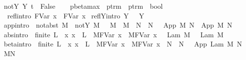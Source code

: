 \begin{isabellebody}
{\isacharbar}\ {\isachardoublequoteopen}not{\isacharunderscore}Y\ {\isacharparenleft}Y\ t{\isacharparenright}\ {\isacharequal}\ False{\isachardoublequoteclose}\isanewline
\isanewline
{}\isamarkupfalse%
\ \isanewline
\ \ pbeta{\isacharunderscore}max\ {\isacharcolon}{\isacharcolon}\ {\isachardoublequoteopen}ptrm\ {\isasymRightarrow}\ ptrm\ {\isasymRightarrow}\ bool{\isachardoublequoteclose}\ {\isacharparenleft}{\isachardoublequoteopen}{\isacharunderscore}\ {\isachargreater}{\isachargreater}{\isachargreater}\ {\isacharunderscore}{\isachardoublequoteclose}\ {\isacharbrackleft}{}{}{\isacharcomma}{}{}{\isacharbrackright}\ {}{}{\isacharparenright}\isanewline
{}\isanewline
\ \ refl{\isacharbrackleft}intro{\isacharbrackright}{\isacharcolon}\ {\isachardoublequoteopen}{\isacharparenleft}FVar\ x{\isacharparenright}\ {\isachargreater}{\isachargreater}{\isachargreater}\ {\isacharparenleft}FVar\ x{\isacharparenright}{\isachardoublequoteclose}\isanewline
{\isacharbar}\ reflY{\isacharbrackleft}intro{\isacharbrackright}{\isacharcolon}\ {\isachardoublequoteopen}Y\ {\isasymsigma}\ {\isachargreater}{\isachargreater}{\isachargreater}\ Y\ {\isasymsigma}{\isachardoublequoteclose}\isanewline
{\isacharbar}\ app{\isacharbrackleft}intro{\isacharbrackright}{\isacharcolon}\ {\isachardoublequoteopen}{\isasymlbrakk}\ not{\isacharunderscore}abst\ M\ {\isacharsemicolon}\ not{\isacharunderscore}Y\ M\ {\isacharsemicolon}\ \ M\ {\isachargreater}{\isachargreater}{\isachargreater}\ M{\isacharprime}\ {\isacharsemicolon}\ N\ {\isachargreater}{\isachargreater}{\isachargreater}\ N{\isacharprime}\ {\isasymrbrakk}\ {\isasymLongrightarrow}\ App\ M\ N\ {\isachargreater}{\isachargreater}{\isachargreater}\ App\ M{\isacharprime}\ N{\isacharprime}{\isachardoublequoteclose}\isanewline
{\isacharbar}\ abs{\isacharbrackleft}intro{\isacharbrackright}{\isacharcolon}\ {\isachardoublequoteopen}{\isasymlbrakk}\ finite\ L\ {\isacharsemicolon}\ {\isacharparenleft}{\isasymAnd}x{\isachardot}\ x\ {\isasymnotin}\ L\ {\isasymLongrightarrow}\ M{\isacharcircum}{\isacharparenleft}FVar\ x{\isacharparenright}\ {\isachargreater}{\isachargreater}{\isachargreater}\ M{\isacharprime}{\isacharcircum}{\isacharparenleft}FVar\ x{\isacharparenright}{\isacharparenright}\ {\isasymrbrakk}\ {\isasymLongrightarrow}\ Lam\ M\ {\isachargreater}{\isachargreater}{\isachargreater}\ \ Lam\ M{\isacharprime}{\isachardoublequoteclose}\isanewline
{\isacharbar}\ beta{\isacharbrackleft}intro{\isacharbrackright}{\isacharcolon}\ {\isachardoublequoteopen}{\isasymlbrakk}\ finite\ L\ {\isacharsemicolon}\ {\isacharparenleft}{\isasymAnd}x{\isachardot}\ x\ {\isasymnotin}\ L\ {\isasymLongrightarrow}\ M{\isacharcircum}{\isacharparenleft}FVar\ x{\isacharparenright}\ {\isachargreater}{\isachargreater}{\isachargreater}\ M{\isacharprime}{\isacharcircum}{\isacharparenleft}FVar\ x{\isacharparenright}{\isacharparenright}\ {\isacharsemicolon}\ N\ {\isachargreater}{\isachargreater}{\isachargreater}\ N{\isacharprime}\ {\isasymrbrakk}\ {\isasymLongrightarrow}\ App\ {\isacharparenleft}Lam\ M{\isacharparenright}\ N\ {\isachargreater}{\isachargreater}{\isachargreater}\ M{\isacharprime}{\isacharcircum}N{\isacharprime}{\isachardoublequoteclose}\isanewline

\end{isabellebody}
